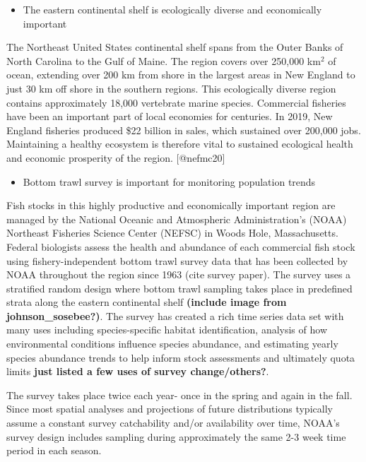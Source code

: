 \documentclass[
  12pt,
]{article}
\providecommand{\tightlist}{%
  \setlength{\itemsep}{0pt}\setlength{\parskip}{0pt}}
\begin{document}
\begin{itemize}
\tightlist
\item
  The eastern continental shelf is ecologically diverse and economically important
\end{itemize}

The Northeast United States continental shelf spans from the Outer Banks of North Carolina to the Gulf of Maine. The region covers over 250,000 km\(^2\) of ocean, extending over 200 km from shore in the largest areas in New England to just 30 km off shore in the southern regions. This ecologically diverse region contains approximately 18,000 vertebrate marine species. Commercial fisheries have been an important part of local economies for centuries. In 2019, New England fisheries produced \$22 billion in sales, which sustained over 200,000 jobs. Maintaining a healthy ecosystem is therefore vital to sustained ecological health and economic prosperity of the region. {[}@nefmc20{]}

\begin{itemize}
\tightlist
\item
  Bottom trawl survey is important for monitoring population trends
\end{itemize}

Fish stocks in this highly productive and economically important region are managed by the National Oceanic and Atmospheric Administration's (NOAA) Northeast Fisheries Science Center (NEFSC) in Woods Hole, Massachusetts. Federal biologists assess the health and abundance of each commercial fish stock using fishery-independent bottom trawl survey data that has been collected by NOAA throughout the region since 1963 (cite survey paper). The survey uses a stratified random design where bottom trawl sampling takes place in predefined strata along the eastern continental shelf \textbf{(include image from johnson\_sosebee?)}. The survey has created a rich time series data set with many uses including species-specific habitat identification, analysis of how environmental conditions influence species abundance, and estimating yearly species abundance trends to help inform stock assessments and ultimately quota limits \textbf{just listed a few uses of survey change/others?}.

The survey takes place twice each year- once in the spring and again in the fall. Since most spatial analyses and projections of future distributions typically assume a constant survey catchability and/or availability over time, NOAA's survey design includes sampling during approximately the same 2-3 week time period in each season.
\end{document}

